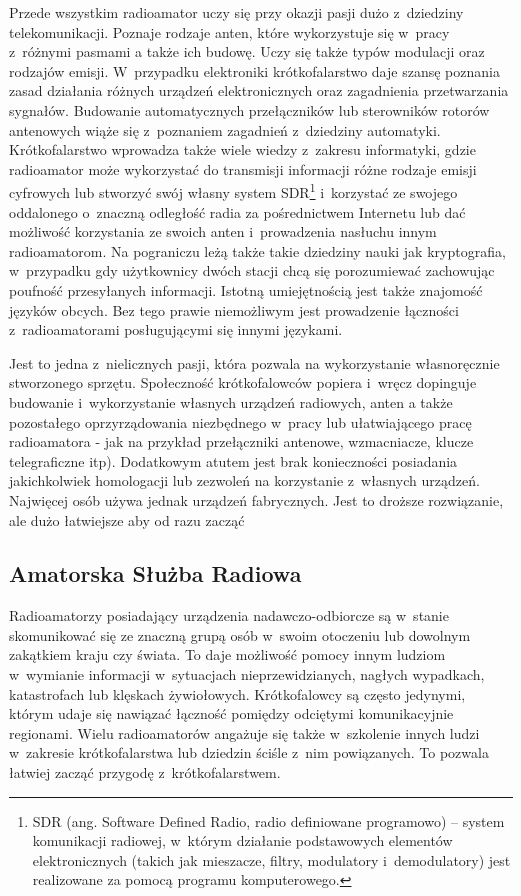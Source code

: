 \documentclass[eng,oneside]{mgr}
\begin{document}
			Przede wszystkim radioamator uczy się przy okazji pasji dużo z~dziedziny telekomunikacji. Poznaje rodzaje anten, które wykorzystuje się w~pracy z~różnymi pasmami a także ich budowę. Uczy się także typów modulacji oraz rodzajów emisji. W~przypadku elektroniki krótkofalarstwo daje szansę poznania zasad działania różnych urządzeń elektronicznych oraz zagadnienia przetwarzania sygnałów. Budowanie automatycznych przełączników lub sterowników rotorów antenowych wiąże się z~poznaniem zagadnień z~dziedziny automatyki. Krótkofalarstwo wprowadza także wiele wiedzy z~zakresu informatyki, gdzie radioamator może wykorzystać do transmisji informacji różne rodzaje emisji cyfrowych lub stworzyć swój własny system SDR\footnote{SDR (ang. Software Defined Radio, radio definiowane programowo) – system komunikacji radiowej, w~którym działanie podstawowych elementów elektronicznych (takich jak mieszacze, filtry, modulatory i~demodulatory) jest realizowane za pomocą programu komputerowego.} i~korzystać ze swojego oddalonego o~znaczną odległość radia za pośrednictwem Internetu lub dać możliwość korzystania ze swoich anten i~prowadzenia nasłuchu innym radioamatorom. Na pograniczu leżą także takie dziedziny nauki jak kryptografia, w~przypadku gdy użytkownicy dwóch stacji chcą się porozumiewać zachowując poufność przesyłanych informacji. Istotną umiejętnością jest także znajomość języków obcych. Bez tego prawie niemożliwym jest prowadzenie łączności z~radioamatorami posługującymi się innymi językami.

			Jest to jedna z~nielicznych pasji, która pozwala na wykorzystanie własnoręcznie stworzonego sprzętu. Społeczność krótkofalowców popiera i~wręcz dopinguje budowanie i~wykorzystanie własnych urządzeń radiowych, anten a także pozostałego oprzyrządowania niezbędnego w~pracy lub ułatwiającego pracę radioamatora - jak na przykład przełączniki antenowe, wzmacniacze, klucze telegraficzne itp). Dodatkowym atutem jest brak konieczności posiadania jakichkolwiek homologacji lub zezwoleń na korzystanie z~własnych urządzeń. Najwięcej osób używa jednak urządzeń fabrycznych. Jest to droższe rozwiązanie, ale dużo łatwiejsze aby od razu zacząć 

			\subsection{Amatorska Służba Radiowa}
			Radioamatorzy posiadający urządzenia nadawczo-odbiorcze są w~stanie skomunikować się ze znaczną grupą osób w~swoim otoczeniu lub dowolnym zakątkiem kraju czy świata. To daje możliwość pomocy innym ludziom w~wymianie informacji w~sytuacjach nieprzewidzianych, nagłych wypadkach, katastrofach lub klęskach żywiołowych. Krótkofalowcy są często jedynymi, którym udaje się nawiązać łączność pomiędzy odciętymi komunikacyjnie regionami. Wielu radioamatorów angażuje się także w~szkolenie innych ludzi w~zakresie krótkofalarstwa lub dziedzin ściśle z~nim powiązanych. To pozwala łatwiej zacząć przygodę z~krótkofalarstwem.
\end{document}
